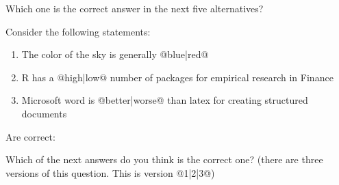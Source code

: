 \documentclass[10pt]{examdesign}
\begin{document}
\vspace{1cm}

\begin{multiplechoice}[resetcounter=no,  examcolumns=1]

\begin{question}

	Which one is the correct answer in the next five alternatives?






\end{question}

\begin{question}

	Consider the following statements:

	\begin{enumerate}[I]
		\item The color of the sky is generally @{blue}|{red}@

		\item R has a @{high}|{low}@ number of packages for empirical research in Finance

		\item Microsoft word is @{better}|{worse}@ than latex for creating structured documents
	\end{enumerate}

	Are correct:






\end{question}


\begin{question}

	Which of the next answers do you think is the correct one? (there are three versions of this question. This is version @{1}|{2}|{3}@)





\end{question}
\end{multiplechoice}
\end{document}
